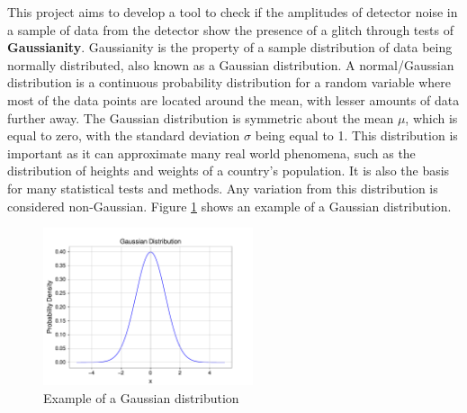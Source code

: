 \documentclass[12pt]{article}
\begin{document}
\medskip
\noindent This project aims to develop a tool to check if the amplitudes of detector noise in a sample of data from the detector show the presence of a glitch through tests of \textbf{Gaussianity}. Gaussianity is the property of a sample distribution of data being normally distributed, also known as a Gaussian distribution. A normal/Gaussian distribution is a continuous probability distribution for a random variable where most of the data points are located around the mean, with lesser amounts of data further away. The Gaussian distribution is symmetric about the mean $\mu$, which is equal to zero, with the standard deviation $\sigma$ being equal to 1. This distribution is important as it can approximate many real world phenomena, such as the distribution of heights and weights of a country's population. It is also the basis for many statistical tests and methods. Any variation from this distribution is considered non-Gaussian. Figure \ref{fig:gaussian_distribution} shows an example of a Gaussian distribution.

\begin{figure}[H]
    \centering
    \includegraphics[width=0.55\textwidth]{images/gaussian_distribution.pdf}
    \caption{Example of a Gaussian distribution}
    \label{fig:gaussian_distribution}
\end{figure}



\end{document}
